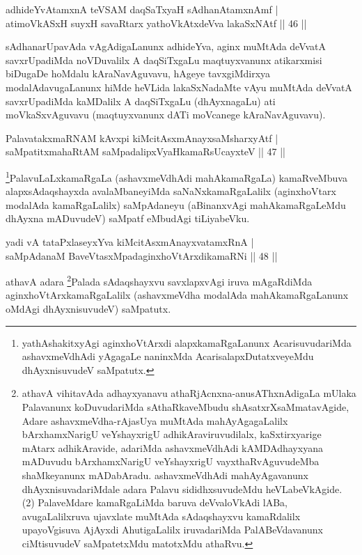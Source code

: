 
\begin{shl}
adhideYvAtamxnA teVSAM daqSaTxyaH sAdhanAtamxnAmf |\\
atimoVkASxH suyxH savaRtarx yathoVkAtxdeVva lakaSxNAtf \hfill || 46 ||
\end{shl}

\begin{artha}
sAdhanarUpavAda vAgAdigaLanunx adhideYva, aginx muMtAda deVvatA savxrUpadiMda noVDuvalilx A daqSiTxgaLu maqtuyxvanunx atikarxmisi biDugaDe hoMdalu kAraNavAguvavu, hAgeye tavxgiMdirxya modalAdavugaLanunx hiMde heVLida lakaSxNadaMte vAyu muMtAda deVvatA savxrUpadiMda kaMDalilx A daqSiTxgaLu (dhAyxnagaLu) ati moVkaSxvAguvavu (maqtuyxvanunx dATi moVcanege kAraNavAguvavu).
\end{artha}


\begin{shl}
PalavatakxmaRNAM kAvxpi kiMcitAsxmAnayxsaMsharxyAtf |\\
saMpatitxmahaRtAM saMpadalipxVyaHkamaRsUcayxteV \hfill || 47 ||
\end{shl}

\begin{artha}
\footnote[1]{yathAshakitxyAgi aginxhoVtArxdi alapxkamaRgaLanunx AcarisuvudariMda ashavxmeVdhAdi yAgagaLe naninxMda AcarisalapxDutatxveyeMdu dhAyxnisuvudeV saMpatutx.}PalavuLaLxkamaRgaLa (ashavxmeVdhAdi mahAkamaRgaLa) kamaRveMbuva alapxsAdaqshayxda avalaMbaneyiMda saNaNxkamaRgaLalilx (aginxhoVtarx modalAda kamaRgaLalilx) saMpAdaneyu (aBinanxvAgi mahAkamaRgaLeMdu dhAyxna mADuvudeV) saMpatf eMbudAgi tiLiyabeVku.
\end{artha}


\begin{shl}
yadi vA tataPxlaseyxYva kiMcitAsxmAnayxvatamxRnA |\\
saMpAdanaM BaveVtasxMpadaginxhoVtArxdikamaRNi \hfill || 48 ||
\end{shl}

\begin{artha}
athavA adara \footnote[2]{athavA vihitavAda adhayxyanavu athaRjAcnxna-anusAThxnAdigaLa mUlaka Palavanunx koDuvudariMda sAthaRkaveMbudu shAsatxrXsaMmatavAgide, Adare ashavxmeVdha-rAjasUya muMtAda mahAyAgagaLalilx bArxhamxNarigU veYshayxrigU adhikAraviruvudilalx, kaSxtirxyarige mAtarx adhikAravide, adariMda ashavxmeVdhAdi kAMDAdhayxyana mADuvudu bArxhamxNarigU veYshayxrigU vayxthaRvAguvudeMba shaMkeyanunx mADabAradu. ashavxmeVdhAdi mahAyAgavanunx dhAyxnisuvadariMdale adara Palavu sididhxsuvudeMdu heVLabeVkAgide. (2) PalaveMdare kamaRgaLiMda baruva deVvaloVkAdi lABa, avugaLalilxruva ujavxlate muMtAda sAdaqshayxvu kamaRdalilx upayoVgisuva AjAyxdi AhutigaLalilx iruvadariMda PalABeVdavanunx ciMtisuvudeV saMpatetxMdu matotxMdu athaRvu.}Palada sAdaqshayxvu savxlapxvAgi iruva mAgaRdiMda aginxhoVtArxkamaRgaLalilx (ashavxmeVdha modalAda mahAkamaRgaLanunx oMdAgi dhAyxnisuvudeV) saMpatutx.
\end{artha}

